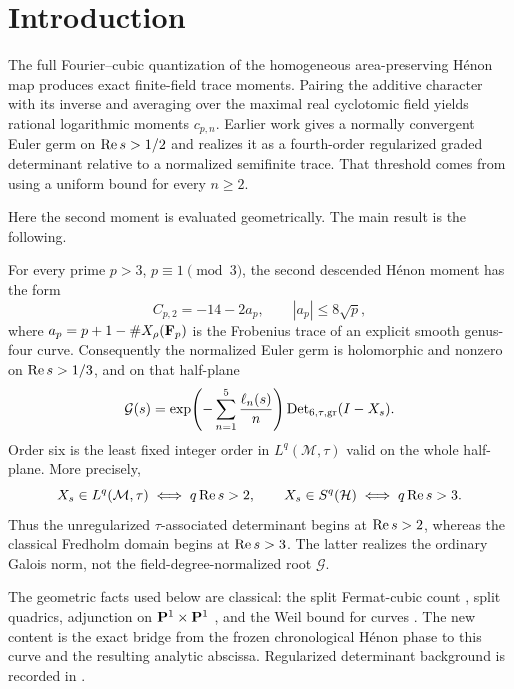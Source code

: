 \section{Introduction}

The full Fourier--cubic quantization of the homogeneous area-preserving
H\'enon map produces exact finite-field trace moments.  Pairing the additive
character with its inverse and averaging over the maximal real cyclotomic
field yields rational logarithmic moments \(c_{p,n}\).  Earlier work gives a
normally convergent Euler germ on \(\operatorname{Re} s>1/2\) and realizes it as a
fourth-order regularized graded determinant relative to a normalized
semifinite trace.  That threshold comes from using a uniform bound for every
\(n\ge2\).

Here the second moment is evaluated geometrically.  The main result is the
following.

\begin{theorem}\label{thm:main}
For every prime \(p>3\), \(p\equiv1\pmod3\), the second descended H\'enon
moment has the form
\[
 C_{p,2}=-14-2a_p,
 \qquad |a_p|\le8\sqrt p,
\]
where \(a_p=p+1-\#X_\rho(\mathbf F_p)\) is the Frobenius trace of an explicit smooth
genus-four curve.  Consequently the normalized Euler germ is holomorphic and
nonzero on \(\operatorname{Re} s>1/3\), and on that half-plane
\[
 \mathcal G(s)=
 \exp\!\left(-\sum_{n=1}^{5}\frac{\ell_n(s)}n\right)
 \operatorname{Det}_{6,\tau,\mathrm{gr}}(I-X_s).
\]
Order six is the least fixed integer order in
\(L^q(\mathcal M,\tau)\) valid on the whole half-plane.  More precisely,
\[
 X_s\in L^q(\mathcal M,\tau)\iff q\operatorname{Re} s>2,
 \qquad
 X_s\in S^q(\mathcal H)\iff q\operatorname{Re} s>3.
\]
Thus the unregularized \(\tau\)-associated determinant begins at
\(\operatorname{Re} s>2\), whereas the classical Fredholm domain begins at
\(\operatorname{Re} s>3\).  The latter realizes the ordinary Galois norm, not the
field-degree-normalized root \(\mathcal G\).
\end{theorem}

The geometric facts used below are classical: the split Fermat-cubic count
\cite[Cor.~8.3]{Massarenti2026}, split quadrics, adjunction on
\(\mathbf P^1\times\mathbf P^1\) \cite[Ch.~V, Prop.~1.5]{Hartshorne1977}, and the Weil
bound for curves \cite[Thm.~5.2.3]{Stichtenoth2009}.  The new content is the exact bridge
from the frozen chronological H\'enon phase to this curve and the resulting
analytic abscissa.  Regularized determinant background is recorded in
\cite[Chapter~9]{Simon2005}.
